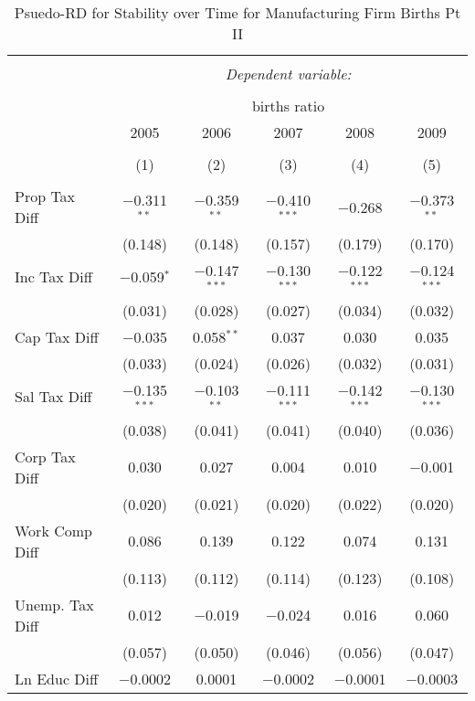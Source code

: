 
\begin{table}[!htbp] \centering 
  \caption{Psuedo-RD for Stability over Time for  Manufacturing Firm Births Pt II} 
  \label{31-33year} 
\small 
\begin{tabular}{@{\extracolsep{5pt}}lccccc} 
\\[-1.8ex]\hline 
\hline \\[-1.8ex] 
 & \multicolumn{5}{c}{\textit{Dependent variable:}} \\ 
\cline{2-6} 
\\[-1.8ex] & \multicolumn{5}{c}{births ratio} \\ 
 & 2005 & 2006 & 2007 & 2008 & 2009 \\ 
\\[-1.8ex] & (1) & (2) & (3) & (4) & (5)\\ 
\hline \\[-1.8ex] 
 Prop Tax Diff & $-$0.311$^{**}$ & $-$0.359$^{**}$ & $-$0.410$^{***}$ & $-$0.268 & $-$0.373$^{**}$ \\ 
  & (0.148) & (0.148) & (0.157) & (0.179) & (0.170) \\ 
  Inc Tax Diff & $-$0.059$^{*}$ & $-$0.147$^{***}$ & $-$0.130$^{***}$ & $-$0.122$^{***}$ & $-$0.124$^{***}$ \\ 
  & (0.031) & (0.028) & (0.027) & (0.034) & (0.032) \\ 
  Cap Tax Diff & $-$0.035 & 0.058$^{**}$ & 0.037 & 0.030 & 0.035 \\ 
  & (0.033) & (0.024) & (0.026) & (0.032) & (0.031) \\ 
  Sal Tax Diff & $-$0.135$^{***}$ & $-$0.103$^{**}$ & $-$0.111$^{***}$ & $-$0.142$^{***}$ & $-$0.130$^{***}$ \\ 
  & (0.038) & (0.041) & (0.041) & (0.040) & (0.036) \\ 
  Corp Tax Diff & 0.030 & 0.027 & 0.004 & 0.010 & $-$0.001 \\ 
  & (0.020) & (0.021) & (0.020) & (0.022) & (0.020) \\ 
  Work Comp Diff & 0.086 & 0.139 & 0.122 & 0.074 & 0.131 \\ 
  & (0.113) & (0.112) & (0.114) & (0.123) & (0.108) \\ 
  Unemp. Tax Diff & 0.012 & $-$0.019 & $-$0.024 & 0.016 & 0.060 \\ 
  & (0.057) & (0.050) & (0.046) & (0.056) & (0.047) \\ 
  Ln Educ Diff & $-$0.0002 & 0.0001 & $-$0.0002 & $-$0.0001 & $-$0.0003 \\ 

\end{tabular}
\end{table}
